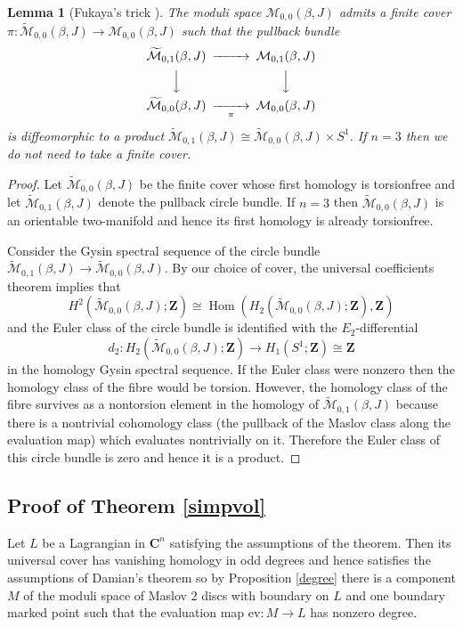 \documentclass{amsart}
\newcommand{\mM}{\mathcal{M}}
\newcommand{\CC}{\mathbf{C}}
\newcommand{\ZZ}{\mathbf{Z}}
\newcommand{\ev}{\mathrm{ev}}
\newcommand{\OP}{\operatorname}
\newtheorem{lma}[thm]{Lemma}
\begin{document}
\begin{lma}[Fukaya's trick {\cite[Remark 12.2(A)]{Fuk}}]\label{fuktrick}
The moduli space $\mM_{0,0}(\beta,J)$ admits a finite cover $\pi\colon\widetilde{\mM}_{0,0}(\beta,J)\to\mM_{0,0}(\beta,J)$ such that the pullback bundle
\[
\begin{CD}
\widetilde{\mM}_{0,1}(\beta,J)@>>>\mM_{0,1}(\beta,J)\\
@VVV @VVV\\
\widetilde{\mM}_{0,0}(\beta,J)@>>{\pi}>\mM_{0,0}(\beta,J)
\end{CD}
\]
is diffeomorphic to a product $\widetilde{\mM}_{0,1}(\beta,J)\cong\widetilde{\mM}_{0,0}(\beta,J)\times S^1$. If $n=3$ then we do not need to take a finite cover.
\end{lma}
\begin{proof}
Let $\widetilde{\mM}_{0,0}(\beta,J)$ be the finite cover whose first homology is torsionfree and let $\widetilde{\mM}_{0,1}(\beta,J)$ denote the pullback circle bundle. If $n=3$ then $\widetilde{\mM}_{0,0}(\beta,J)$ is an orientable two-manifold and hence its first homology is already torsionfree.

Consider the Gysin spectral sequence of the circle bundle $\widetilde{\mM}_{0,1}(\beta,J)\rightarrow\widetilde{\mM}_{0,0}(\beta,J)$. By our choice of cover, the universal coefficients theorem implies that
\[H^2(\widetilde{\mM}_{0,0}(\beta,J);\ZZ)\cong\OP{Hom}(H_2(\widetilde{\mM}_{0,0}(\beta,J);\ZZ),\ZZ)\]
and the Euler class of the circle bundle is identified with the $E_2$-differential
\[d_2\colon H_2(\widetilde{\mM}_{0,0}(\beta,J);\ZZ)\to H_1(S^1;\ZZ)\cong\ZZ\]
in the homology Gysin spectral sequence. If the Euler class were nonzero then the homology class of the fibre would be torsion. However, the homology class of the fibre survives as a nontorsion element in the homology of $\widetilde{\mM}_{0,1}(\beta,J)$ because there is a nontrivial cohomology class (the pullback of the Maslov class along the evaluation map) which evaluates nontrivially on it. Therefore the Euler class of this circle bundle is zero and hence it is a product.
\end{proof}


\subsection{Proof of Theorem \ref{simpvol}}
Let $L$ be a Lagrangian in $\CC^n$ satisfying the assumptions of the theorem. Then its universal cover has vanishing homology in odd degrees and hence satisfies the assumptions of Damian's theorem so by Proposition \ref{degree} there is a component $M$ of the moduli space of Maslov 2 discs with boundary on $L$ and one boundary marked point such that the evaluation map $\ev:M\rightarrow L$ has nonzero degree.
\end{document}
